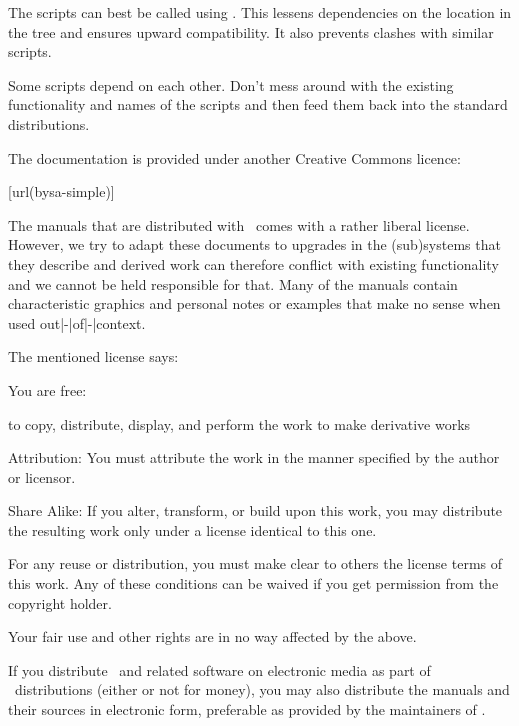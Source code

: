 \startitem
    The scripts can best be called using . This lessens dependencies
    on the location in the tree and ensures upward compatibility. It also prevents
    clashes with similar scripts.
\stopitem

\startitem
    Some scripts depend on each other. Don't mess around with the existing
    functionality and names of the scripts and then feed them back into the
    standard distributions.
\stopitem

\stopitemize

\stopsubject

\startsubject[title={Documents}]

The documentation is provided under another Creative Commons licence:

\startnarrower
    [url(bysa-simple)]
\stopnarrower

The manuals that are distributed with \CONTEXT\ comes with a rather liberal
license. However, we try to adapt these documents to upgrades in the (sub)systems
that they describe and derived work can therefore conflict with existing
functionality and we cannot be held responsible for that. Many of the manuals
contain characteristic graphics and personal notes or examples that make no sense
when used out|-|of|-|context.

The mentioned license says:

\startcolor[blue]
You are free:

\startitemize
    \startitem to copy, distribute, display, and perform the work \stopitem
    \startitem to make derivative works \stopitem
\stopitemize

{\sc Attribution:} You must attribute the work in the manner specified by the
author or licensor.

{\sc Share Alike:} If you alter, transform, or build upon this work, you may
distribute the resulting work only under a license identical to this one.

\startitemize
    \startitem
        For any reuse or distribution, you must make clear to others the license
        terms of this work.
    \stopitem
    \startitem
        Any of these conditions can be waived if you get permission from the
        copyright holder.
    \stopitem
\stopitemize

Your fair use and other rights are in no way affected by the above.
\stopcolor

If you distribute \CONTEXT\ and related software on electronic media as part of
\TEX\ distributions (either or not for money), you may also distribute the
manuals and their sources in electronic form, preferable as provided by the
maintainers of \CONTEXT.

